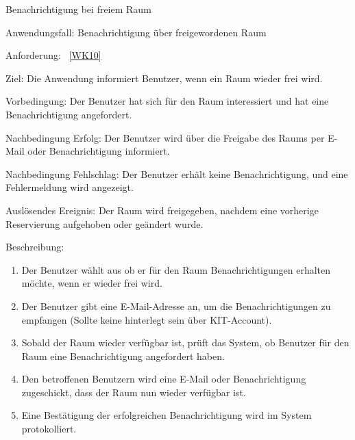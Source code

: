 \begin{function}{60}{Benachrichtigung bei freiem Raum}
    \item[Anwendungsfall:] Benachrichtigung über freigewordenen Raum
    \item[Anforderung:] ~\ref{WK10}
    \item[Ziel:] Die Anwendung informiert Benutzer, wenn ein Raum wieder frei wird.
    \item[Vorbedingung:] Der Benutzer hat sich für den Raum interessiert und hat eine Benachrichtigung angefordert.
    \item[Nachbedingung Erfolg:] Der Benutzer wird über die Freigabe des Raums per E-Mail oder Benachrichtigung informiert.
    \item[Nachbedingung Fehlschlag:] Der Benutzer erhält keine Benachrichtigung, und eine Fehlermeldung wird angezeigt.
    \item[Auslösendes Ereignis:] Der Raum wird freigegeben, nachdem eine vorherige Reservierung aufgehoben oder geändert wurde.
    \item[Beschreibung:] ~
    \begin{enumerate}
        \item Der Benutzer wählt aus ob er für den Raum Benachrichtigungen erhalten möchte, wenn er wieder frei wird.
        \item Der Benutzer gibt eine E-Mail-Adresse an, um die Benachrichtigungen zu empfangen (Sollte keine hinterlegt sein über KIT-Account).
        \item Sobald der Raum wieder verfügbar ist, prüft das System, ob Benutzer für den Raum eine Benachrichtigung angefordert haben.
        \item Den betroffenen Benutzern wird eine E-Mail oder Benachrichtigung zugeschickt, dass der Raum nun wieder verfügbar ist.
        \item Eine Bestätigung der erfolgreichen Benachrichtigung wird im System protokolliert.
    \end{enumerate}
\end{function}

\pagebreak

